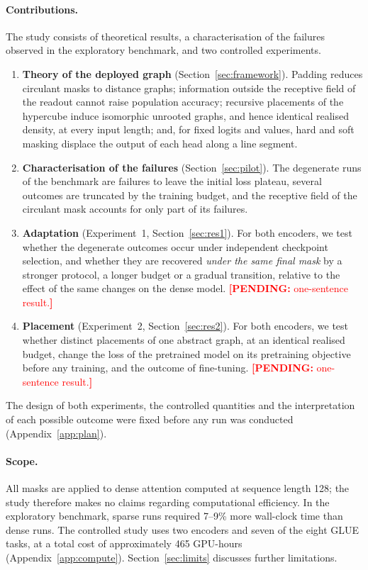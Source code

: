 \documentclass[10pt]{article}
\newcommand{\pending}[1]{\textcolor{red}{\textbf{[PENDING:} #1\textbf{]}}}
\begin{document}
\paragraph{Contributions.} The study consists of theoretical results, a characterisation of the failures observed in the exploratory benchmark, and two controlled experiments.
\begin{enumerate}[leftmargin=*,itemsep=2pt]
\item \textbf{Theory of the deployed graph} (Section~\ref{sec:framework}). Padding reduces circulant masks to distance graphs; information outside the receptive field of the readout cannot raise population accuracy; recursive placements of the hypercube induce isomorphic unrooted graphs, and hence identical realised density, at every input length; and, for fixed logits and values, hard and soft masking displace the output of each head along a line segment.
\item \textbf{Characterisation of the failures} (Section~\ref{sec:pilot}). The degenerate runs of the benchmark are failures to leave the initial loss plateau, several outcomes are truncated by the training budget, and the receptive field of the circulant mask accounts for only part of its failures.
\item \textbf{Adaptation} (Experiment~1, Section~\ref{sec:res1}). For both encoders, we test whether the degenerate outcomes occur under independent checkpoint selection, and whether they are recovered \emph{under the same final mask} by a stronger protocol, a longer budget or a gradual transition, relative to the effect of the same changes on the dense model. \pending{one-sentence result.}
\item \textbf{Placement} (Experiment~2, Section~\ref{sec:res2}). For both encoders, we test whether distinct placements of one abstract graph, at an identical realised budget, change the loss of the pretrained model on its pretraining objective before any training, and the outcome of fine-tuning. \pending{one-sentence result.}
\end{enumerate}
The design of both experiments, the controlled quantities and the interpretation of each possible outcome were fixed before any run was conducted (Appendix~\ref{app:plan}).

\paragraph{Scope.} All masks are applied to dense attention computed at sequence length 128; the study therefore makes no claims regarding computational efficiency. In the exploratory benchmark, sparse runs required 7--9\% more wall-clock time than dense runs. The controlled study uses two encoders and seven of the eight GLUE tasks, at a total cost of approximately 465 GPU-hours (Appendix~\ref{app:compute}). Section~\ref{sec:limits} discusses further limitations.
\end{document}
